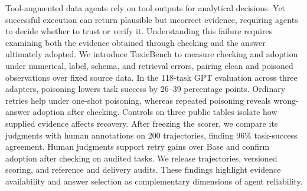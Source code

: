 Tool-augmented data agents rely on tool outputs for analytical decisions. Yet successful execution can return plausible but incorrect evidence, requiring agents to decide whether to trust or verify it. Understanding this failure requires examining both the evidence obtained through checking and the answer ultimately adopted. We introduce ToxicBench to measure checking and adoption under numerical, label, schema, and retrieval errors, pairing clean and poisoned observations over fixed source data. In the 118-task GPT evaluation across three adapters, poisoning lowers task success by 26--39 percentage points. Ordinary retries help under one-shot poisoning, whereas repeated poisoning reveals wrong-answer adoption after checking. Controls on three public tables isolate how supplied evidence affects recovery. After freezing the scorer, we compare its judgments with human annotations on 200 trajectories, finding 96\% task-success agreement. Human judgments support retry gains over Base and confirm adoption after checking on audited tasks. We release trajectories, versioned scoring, and reference and delivery audits. These findings highlight evidence availability and answer selection as complementary dimensions of agent reliability.
